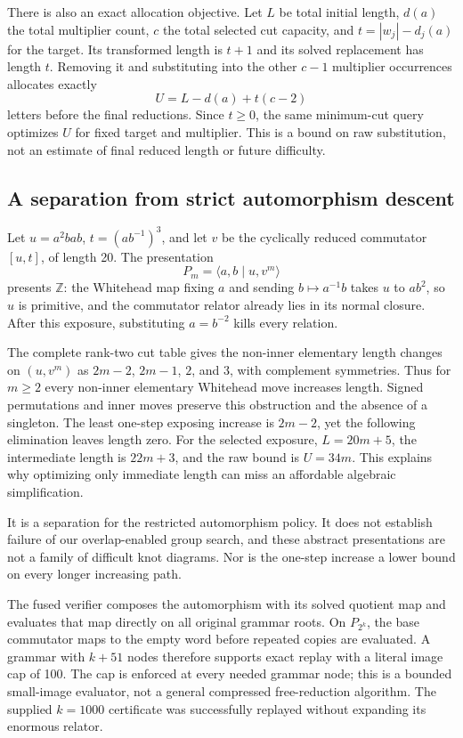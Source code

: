 There is also an exact allocation objective. Let $L$ be total initial length,
$d(a)$ the total multiplier count, $c$ the total selected cut capacity, and
$t=|w_j|-d_j(a)$ for the target. Its transformed length is $t+1$ and its
solved replacement has length $t$. Removing it and substituting into the
other $c-1$ multiplier occurrences allocates exactly
\[
 U=L-d(a)+t(c-2)
\]
letters before the final reductions. Since $t\ge0$, the same minimum-cut
query optimizes $U$ for fixed target and multiplier. This is a bound on raw
substitution, not an estimate of final reduced length or future difficulty.

\subsection{A separation from strict automorphism descent}

Let $u=a^2bab$, $t=(ab^{-1})^3$, and let $v$ be the cyclically reduced
commutator $[u,t]$, of length 20. The presentation
\[
 P_m=\langle a,b\mid u,v^m\rangle
\]
presents $\mathbb Z$: the Whitehead map fixing $a$ and sending
$b\mapsto a^{-1}b$ takes $u$ to $ab^2$, so $u$ is primitive, and the
commutator relator already lies in its normal closure. After this exposure,
substituting $a=b^{-2}$ kills every relation.

The complete rank-two cut table gives the non-inner elementary length
changes on $(u,v^m)$ as $2m-2$, $2m-1$, $2$, and $3$, with complement
symmetries. Thus for $m\ge2$ every non-inner elementary Whitehead move
increases length. Signed permutations and inner moves preserve this
obstruction and the absence of a singleton. The least one-step exposing
increase is $2m-2$, yet the following elimination leaves length zero.
For the selected exposure, $L=20m+5$, the intermediate length is $22m+3$,
and the raw bound is $U=34m$. This explains why optimizing only immediate
length can miss an affordable algebraic simplification.

It is a separation for the restricted automorphism policy. It does not
establish failure of our overlap-enabled group search, and these abstract
presentations are not a family of difficult knot diagrams. Nor is the
one-step increase a lower bound on every longer increasing path.

The fused verifier composes the automorphism with its solved quotient map
and evaluates that map directly on all original grammar roots. On
$P_{2^k}$, the base commutator maps to the empty word before repeated copies
are evaluated. A grammar with $k+51$ nodes therefore supports exact replay
with a literal image cap of 100. The cap is enforced at every needed grammar
node; this is a bounded small-image evaluator, not a general compressed
free-reduction algorithm. The supplied $k=1000$ certificate was successfully
replayed without expanding its enormous relator.

